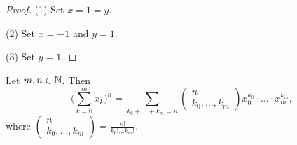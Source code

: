 \begin{proof}
(1) Set $x = 1 = y$.

(2) Set $x = -1$ and $y = 1$.

(3) Set $y=1$.
\end{proof}
\begin{corollary} \label{multinomialIdentity}
Let $m,n\in \mathbb{N}$. Then
\[ \Big(\sum_{k=0}^m x_k\Big)^n = \sum_{k_0+\ldots + k_m = n}\begin{pmatrix}
n \\ k_0, \ldots, k_m
\end{pmatrix}x_0^{k_0}\cdot\ldots\cdot x_m^{k_m}, \]
where $\begin{pmatrix}
n \\ k_0, \ldots, k_m
\end{pmatrix} = \frac{n!}{k_0!\ldots k_m!}$.
\end{corollary}

